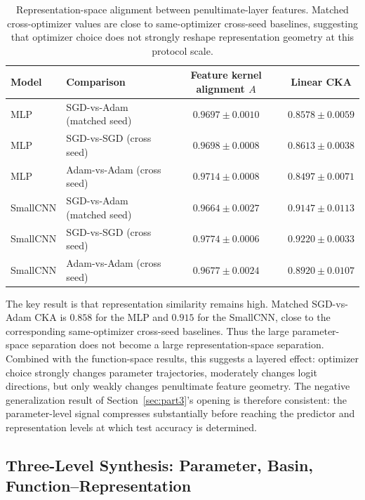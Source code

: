 \documentclass[11pt]{article}
\begin{document}
\begin{table}[H]
\centering
\small
\begin{tabular}{llcc}
\toprule
\textbf{Model} & \textbf{Comparison} & \textbf{Feature kernel alignment $A$} & \textbf{Linear CKA} \\
\midrule
MLP      & SGD-vs-Adam (matched seed) & $0.9697 \pm 0.0010$ & $0.8578 \pm 0.0059$ \\
MLP      & SGD-vs-SGD (cross seed)    & $0.9698 \pm 0.0008$ & $0.8613 \pm 0.0038$ \\
MLP      & Adam-vs-Adam (cross seed)  & $0.9714 \pm 0.0008$ & $0.8497 \pm 0.0071$ \\
\addlinespace
SmallCNN & SGD-vs-Adam (matched seed) & $0.9664 \pm 0.0027$ & $0.9147 \pm 0.0113$ \\
SmallCNN & SGD-vs-SGD (cross seed)    & $0.9774 \pm 0.0006$ & $0.9220 \pm 0.0033$ \\
SmallCNN & Adam-vs-Adam (cross seed)  & $0.9677 \pm 0.0024$ & $0.8920 \pm 0.0107$ \\
\bottomrule
\end{tabular}
\caption{Representation-space alignment between penultimate-layer features. Matched cross-optimizer values are close to same-optimizer cross-seed baselines, suggesting that optimizer choice does not strongly reshape representation geometry at this protocol scale.}
\label{tab:representation}
\end{table}

The key result is that representation similarity remains high. Matched SGD-vs-Adam CKA is $0.858$ for the MLP and $0.915$ for the SmallCNN, close to the corresponding same-optimizer cross-seed baselines. Thus the large parameter-space separation does not become a large representation-space separation. Combined with the function-space results, this suggests a layered effect: optimizer choice strongly changes parameter trajectories, moderately changes logit directions, but only weakly changes penultimate feature geometry. The negative generalization result of Section~\ref{sec:part3}'s opening is therefore consistent: the parameter-level signal compresses substantially before reaching the predictor and representation levels at which test accuracy is determined.

\FloatBarrier

\subsection{Three-Level Synthesis: Parameter, Basin, Function--Representation}
\label{sec:three-level}
\end{document}

